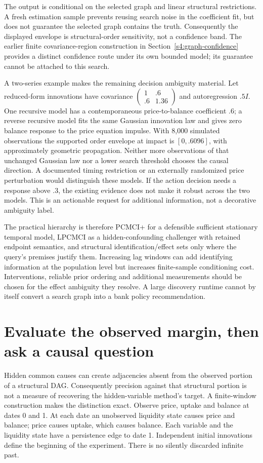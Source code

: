 The output is conditional on the selected graph and linear structural
restrictions. A fresh estimation sample prevents reusing search noise in the
coefficient fit, but does not guarantee the selected graph contains the
truth. Consequently the displayed envelope is structural-order sensitivity,
not a confidence band. The earlier finite covariance-region construction
in Section~\ref{s4:graph-confidence} provides a distinct confidence route
under its own bounded model; its guarantee cannot be attached to this search.

A two-series example makes the remaining decision ambiguity material.
Let reduced-form innovations have covariance
$\left(\begin{smallmatrix}1&.6\\.6&1.36\end{smallmatrix}\right)$ and
autoregression $.5I$. One recursive model has a contemporaneous
price-to-balance coefficient .6; a reverse recursive model fits the same
Gaussian innovation law and gives zero balance response to the price
equation impulse. With 8,000 simulated observations the supported order
envelope at impact is $[0,.6096]$, with approximately geometric propagation.
Neither more observations of that unchanged Gaussian law nor a lower search
threshold chooses the causal direction. A documented timing restriction or
an externally randomized price perturbation would distinguish these models.
If the action decision needs a response above .3, the existing evidence does
not make it robust across the two models. This is an actionable request for
additional information, not a decorative ambiguity label.

The practical hierarchy is therefore PCMCI+ for a defensible sufficient
stationary temporal model, LPCMCI as a hidden-confounding challenger with
retained endpoint semantics, and structural identification/effect sets only
where the query's premises justify them. Increasing lag windows can add
identifying information at the population level but increases finite-sample
conditioning cost. Interventions, reliable prior ordering and additional
measurements should be chosen for the effect ambiguity they resolve. A
large discovery runtime cannot by itself convert a search graph into a
bank policy recommendation.


\section{Evaluate the observed margin, then ask a causal question}
\label{s6:ancestral-target}
Hidden common causes can create adjacencies absent from the observed portion
of a structural DAG. Consequently precision against that structural portion
is not a measure of recovering the hidden-variable method's target. A
finite-window construction makes the distinction exact. Observe price,
uptake and balance at dates 0 and 1. At each date an unobserved liquidity
state causes price and balance; price causes uptake, which causes balance.
Each variable and the liquidity state have a persistence edge to date 1.
Independent initial innovations define the beginning of the experiment.
There is no silently discarded infinite past.

